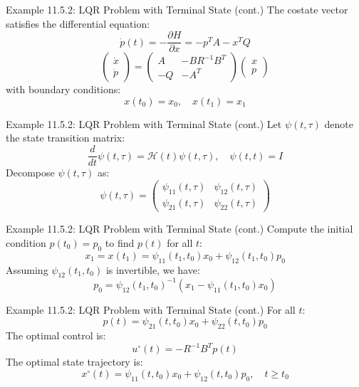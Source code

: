 \documentclass[10pt]{beamer}
\begin{document}
\begin{frame}[fragile]{Example 11.5.2: LQR Problem with Terminal State (cont.)}
  The costate vector satisfies the differential equation:
  \[
  \dot{p}(t) = -\frac{\partial H}{\partial x} = -p^T A - x^T Q
  \]
  \[
    \begin{pmatrix}
      \dot{x} \\
      \dot{p}
      \end{pmatrix} = \begin{pmatrix}
  A & -BR^{-1}B^T \\
  -Q & -A^T
  \end{pmatrix} \begin{pmatrix}
  x \\
  p
  \end{pmatrix}
  \]
  with boundary conditions:
  \[
  x(t_0) = x_0, \quad x(t_1) = x_1
  \]
\end{frame}
  
\begin{frame}[fragile]{Example 11.5.2: LQR Problem with Terminal State (cont.)}
  Let \( \psi(t, \tau) \) denote the state transition matrix:
  \[
  \frac{d}{dt} \psi(t, \tau) = \mathcal{H}(t) \psi(t, \tau), \quad \psi(t, t) = I
  \]
  Decompose \( \psi(t, \tau) \) as:
  \[
  \psi(t, \tau) = \begin{pmatrix}
  \psi_{11}(t, \tau) & \psi_{12}(t, \tau) \\
  \psi_{21}(t, \tau) & \psi_{22}(t, \tau)
  \end{pmatrix}
  \]
\end{frame}
  
\begin{frame}[fragile]{Example 11.5.2: LQR Problem with Terminal State (cont.)}
  Compute the initial condition \( p(t_0) = p_0 \) to find \( p(t) \) for all \( t \):
  \[
  x_1 = x(t_1) = \psi_{11}(t_1, t_0) x_0 + \psi_{12}(t_1, t_0) p_0
  \]
  Assuming \( \psi_{12}(t_1, t_0) \) is invertible, we have:
  \[
  p_0 = \psi_{12}(t_1, t_0)^{-1} (x_1 - \psi_{11}(t_1, t_0) x_0)
  \]
\end{frame}
  
\begin{frame}[fragile]{Example 11.5.2: LQR Problem with Terminal State (cont.)}
  For all \( t \):
  \[
  p(t) = \psi_{21}(t, t_0) x_0 + \psi_{22}(t, t_0) p_0
  \]
  The optimal control is:
  \[
  u^\circ(t) = -R^{-1} B^T p(t)
  \]
  The optimal state trajectory is:
  \[
  x^\circ(t) = \psi_{11}(t, t_0) x_0 + \psi_{12}(t, t_0) p_0, \quad t \ge t_0
  \]
\end{frame}
  
\end{document}
